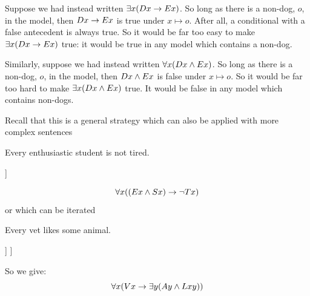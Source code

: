 		Suppose we had instead written $\exists x(Dx\rightarrow Ex)$. So long as there is a non-dog, $o$, in the model, then $Dx\rightarrow Ex$ is true under $x\mapsto o$. After all, a conditional with a false antecedent is always true. So it would be far too easy to make $\exists x(Dx\rightarrow Ex)$ true: it would be true in any model which contains a non-dog. 
		
		Similarly, suppose we had instead written $\forall x(Dx\mathbin{\wedge} Ex)$. So long as there is a non-dog, $o$, in the model, then $Dx\mathbin{\wedge} Ex$ is false under $x\mapsto o$. So it would be far too hard to make $\exists x (Dx\mathbin{\wedge} Ex)$ true. It would be false in any model which contains non-dogs. 
		
		
		
		Recall that this is a general strategy which can also be applied with more complex sentences
		\begin{samplesent}
			\item Every enthusiastic student is not tired. 
		\end{samplesent}
		\begin{center}
			\begin{forest}
				[Every enthusiastic student is not tired\\
				For all $x$: if \ldots then \ldots\\
				$\forall x(\ldots\eif\ldots)$
				[$x$ is an enthusiastic student\\$(Ex\eand Sx)$]
				[$x$ is not tired\\$\enot Tx$]
				]
			\end{forest}
		\end{center}$$\forall x((Ex\mathbin{\wedge} Sx)\rightarrow\neg Tx)$$		
		or which can be iterated
		\begin{samplesent}
			\item Every vet likes some animal.
		\end{samplesent}
		
		\begin{center}
			\begin{forest}
				[Every vet likes some animal. \\
				For all $x$:   if \ldots then \ldots\\
				$\forall x(\ldots\eif \ldots)$
				[$x$ is a vet\\$Vx$]
				[$x$ likes some animal\\There exists $y$ \ldots and \ldots\\$\exists y(\ldots\eand\ldots)$
				[$y$ is an animal\\$Ay$]
				[$x$ likes $y$\\$Lxy$]
				]
				]
			\end{forest}
		\end{center}
		So we give: $$\forall x(Vx\rightarrow\exists y(Ay\mathbin{\wedge} Lxy))$$
		
